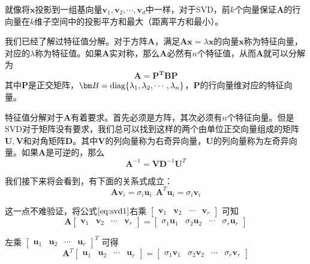 \documentclass[UTF8]{ctexbook}
\newcommand{\diag}{\textup{diag}}
\begin{document}
就像将$\bm x$投影到一组基向量$\bm v_1, \bm v_2, \cdots, \bm v_d$中一样，对于SVD，前$k$个向量保证$\bm A$的行向量在$k$维子空间中的投影平方和最大（距离平方和最小）。

我们已经了解过特征值分解。对于方阵$\bm A$，满足$\bm A \bm x = \lambda \bm x$的向量$\bm x$称为特征向量，对应的$\lambda$称为特征值。如果$\bm A$实对称，那么$\bm A$必然有$n$个特征值，从而$\bm A$就可以分解为
\begin{equation}
	\bm A = \bm{P^T B P}
\end{equation}
其中$\bm P$是正交矩阵，$\bm B = \diag \{\lambda_1, \lambda_2, \cdots, \lambda_n\}$，$\bm P$的行向量维对应的特征向量。

特征值分解对于$\bm A$有着要求。首先必须是方阵，其次必须有$n$个特征向量。但是SVD对于矩阵没有要求，我们总可以找到这样的两个由单位正交向量组成的矩阵$\bm U, \bm V$和对角矩阵$\bm D$。其中$\bm V$的列向量称为右奇异向量，$\bm U$的列向量称为左奇异向量。如果$\bm A$是可逆的，那么
\begin{equation}
	\bm A^{-1} = \bm V \bm D^{-1}\bm U^{T}	
\end{equation}

我们接下来将会看到，有下面的关系式成立：
\begin{equation}
\bm A \bm v_i = \sigma_i \bm u_i\ \ \bm A^{T} \bm u_i = \sigma_i \bm v_i	
\end{equation}

这一点不难验证，将公式$\ref{eq:svd1}$右乘
$\begin{bmatrix}
	\bm v_1 & \bm v_2 & \cdots & \bm v_r
\end{bmatrix}
$
可知
\begin{equation}
	\bm A 
	\begin{bmatrix}
		\bm v_1 & \bm v_2 & \cdots & \bm v_r
	\end{bmatrix}	
	=
	\begin{bmatrix}
		\sigma_1\bm u_1 & \sigma_2 \bm u_2 & \cdots & \sigma_r \bm u_r
	\end{bmatrix}
\end{equation}

左乘
$\begin{bmatrix}
	\bm u_1 & \bm u_2 & \cdots & \bm u_r
\end{bmatrix}^T$
可得
\begin{equation}
	\bm A ^T
	\begin{bmatrix}
		\bm u_1 & \bm u_2 & \cdots & \bm u_r
	\end{bmatrix}
	=
	\begin{bmatrix}
		\sigma_1\bm v_1 & \sigma_2 \bm v_2 & \cdots & \sigma_r \bm v_r
	\end{bmatrix}
\end{equation}
\end{document}
